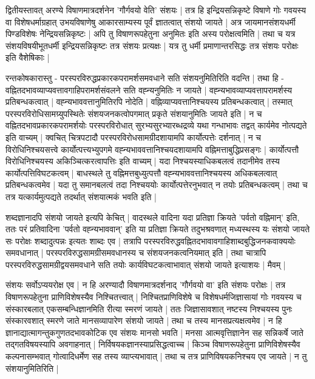 द्वितीयस्तावत् अरण्ये विषाणमात्रदर्शनेन 'गौर्गवयो वेति' संशयः | तत्र हि इन्द्रियसन्निकृष्टे विषाणे गोः गवयस्य वा विशेषधर्माग्रहात् उभयविषाणेषु आकारसाम्यस्य पूर्वं ज्ञातत्वात् संशयो जायते | अत्र जायमानसंशयधर्मी पिण्डविशेषः नेन्द्रियसन्निकृष्टः | अपि तु विषाणरूपहेतुना अनुमितः इति अस्य परोक्षत्वमिति | तथा च यत्र संशयविषयीभूतधर्मी इन्द्रियसन्निकृष्टः तत्र संशयः प्रत्यक्षः | यत्र तु धर्मी प्रमाणान्तरसिद्धः तत्र संशयः परोक्षः इति वैशेषिकाः |

रन्तकोषकारास्तु - परस्परविरुद्धप्रकारकपरामर्शसमवधाने सति संशयनुमितिरिति वदन्ति | तथा हि - वह्नितदभावव्याप्यवत्तावगाहिपरामर्शसंवलने सति वह्न्यनुमितिः न जायते | वह्न्यभावव्याप्यवत्तापरामर्शस्य प्रतिबन्धकत्वात् | वह्न्यभाववत्तानुमितिरपि नोदेति | वह्निव्याप्यवत्तानिश्चयस्य प्रतिबन्धकत्वात् | तस्मात् परस्परविरोधिसामग्र्युपस्थितेः संशयजनकत्वोपगमात् प्रकृते संशयानुमितिः जायते इति | न च वह्नितदभावप्रकारकपरामर्शयोः परस्परविरोधात् सुरभ्यसुरभ्यारब्धद्रव्ये यथा गन्धाभावः तद्वत् कार्यमेव नोत्पद्यते इति वाच्यम् | क्वचित् चित्रपटादौ परस्परविरोधसामग्रीदशायामपि कार्योत्पत्तेः दर्शनात् | न च विरोधिनिश्चयसत्त्वे कार्योत्पत्त्यभ्युपगमे वह्न्यभाववत्तानिश्चयदशायामपि वह्निमत्ताबुद्धिप्रसङ्गः | कार्योत्पत्तौ विरोधिनिश्चयस्य अकिञ्चित्करत्वापत्तिः इति वाच्यम् | यदा निश्चयस्याधिकबलत्वं तदानीमेव तस्य कार्योत्पत्तिविघटकत्वम् | बाधस्थले तु वह्निमत्तबुध्युत्पत्तौ वह्न्यभाववत्तानिश्चयस्य अधिकबलत्वात् प्रतिबन्धकत्वमेव | यदा तु समानबलत्वं तदा निश्चययोः कार्योत्पत्तेरनुभवात् न तयोः प्रतिबन्धकत्वम् | तथा च तत्र यत्कार्यमुत्पद्यते तदर्थात् संशयात्मकं भवति इति |

शब्दज्ञानादपि संशयो जायते इत्यपि केचित् | वादस्थले वादिना यदा प्रतिज्ञा क्रियते 'पर्वतो वह्निमान्' इति, ततः परं प्रतिवादिना 'पर्वतो वह्न्यभाववान्' इति या प्रतिज्ञा क्रियते तदुभश्रवणात् मध्यस्थस्य यः संशयो जायते सः परोक्षः शब्दादुत्पन्नः इत्यतः शाब्दः एव | तत्रापि परस्परविरुद्धवह्नितदभावावगाहिशाब्दबुद्धिजनकवाक्ययोः समवधानात् | परस्परविरुद्धसामग्रीसमवधानस्य च संशयजनकत्वनियमात् इति | तथा चात्रापि परस्परविरुद्धसामग्रीद्वयसमवधाने सति तयोः कार्यविघटकत्वाभावात् संशयो जायते इत्याशयः | मैवम् |

संशयः सर्वोऽप्ययरोक्ष एव | न हि अरण्यादौ विषाणमात्रदर्शनाद् 'गौर्गवयो वा' इति संशयः परोक्षः | तत्र विषाणरूपहेतुना प्राणिविशेषस्यैव निश्चितत्त्वात् | निश्चितप्राणिविशेषे च विशेषधर्मजिज्ञासायां गोः गवयस्य च संस्कारबलात् एकसम्बन्धिज्ञानमिति रीत्या स्मरणं जायते | ततः जिज्ञासावशात् नष्टस्य निश्चयस्य पुनः संस्कारवशात् स्मरणे जाते मानसव्यापारेण संशयो जायते | तथा च तस्य मानसप्रत्यक्षत्वमेव | न हि ज्ञानाद्यात्मागन्तुकगुणतदभावकोटिक  एव संशयः मानसो भवति | मनसा आत्मवृत्तिज्ञानेन सह सन्निकर्षे जाते तद्गतविषयस्यापि अवगाहनात् | निर्विषयकज्ञानस्याप्रसिद्धत्वाच्च | किञ्च विषाणरूपहेतुना प्राणिविशेषस्यैव कल्पनासम्भवात् गोत्वादिधर्मेण सह तस्य व्याप्त्यभावात् | तथा च तत्र प्राणिविषयकनिश्चय एव जायते | न तु संशयानुमितिरिति |

